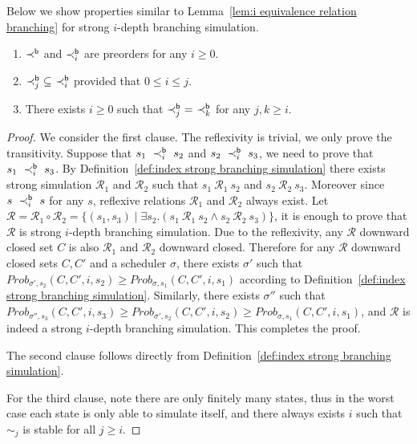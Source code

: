 \documentclass{LMCS}
\newcommand{\iBS}[1]{\sim_{#1}}
\newcommand{\iBSi}[1]{\prec_{#1}^{{\sf b}}}
\newcommand{\MC}[1]{\mathcal{#1}}
\newcommand{\MEASURE}{\mathit{Prob}}
\begin{document}
Below we show properties similar to Lemma~\ref{lem:i equivalence relation branching} for strong $i$-depth branching simulation.
\begin{lem}\label{lem:i preorder relation branching}\hfill
\begin{enumerate}[\em(1)]
\item $\iBSi{}$ and $\iBSi{i}$ are preorders for any $i\geq0$.
\item $\iBSi{j}~\subseteq~\iBSi{i}$ provided that $0\leq i \leq j$.
\item There exists $i\geq 0$ such that $\iBSi{j}~=~\iBSi{k}$ for any $j,k\geq i$.
\end{enumerate}
\end{lem}
\begin{proof}
We consider the first clause. The reflexivity is trivial, we only prove the
  transitivity. Suppose that $s_1~\iBSi{i}~s_2$ and
  $s_2~\iBSi{i}~s_3$, we need to prove that $s_1~\iBSi{i}~s_3$. By
  Definition~\ref{def:index strong branching simulation} there exists
  strong simulation $\MC{R}_1$ and $\MC{R}_2$ such that
  $s_1~\MC{R}_1~s_2$ and $s_2~\MC{R}_2~s_3$. 
 Moreover since $s~\iBSi{i}~s$ for any $s$,  reflexive relations $\MC{R}_1$ and $\MC{R}_2$  
  always exist. Let
  $\MC{R}=\MC{R}_1\circ\MC{R}_2=\{(s_1,s_3)\mid\exists
  s_2.(s_1~\MC{R}_1~s_2\land s_2~\MC{R}_2~s_3)\}$, it is enough to
  prove that $\MC{R}$ is strong $i$-depth branching simulation. Due to
  the reflexivity, any $\MC{R}$ downward closed set $C$ is also
  $\MC{R}_1$ and $\MC{R}_2$ downward closed. Therefore for any
  $\MC{R}$ downward closed sets $C,C'$ and a scheduler $\sigma$, 
  there exists $\sigma'$ such that
  $\MEASURE_{\sigma',s_2}(C,C',i,s_2)\geq\MEASURE_{\sigma,s_1}(C,C',i,s_1)$
  according to Definition~\ref{def:index strong branching
    simulation}. Similarly, there exists $\sigma''$ such that
  $\MEASURE_{\sigma'',s_3}(C,C',i,s_3)\geq\MEASURE_{\sigma',s_2}(C,C',i,s_2)\geq\MEASURE_{\sigma,s_1}(C,C',i,s_1)$,
  and $\MC{R}$ is indeed a strong $i$-depth branching simulation. This
  completes the proof.

The second clause follows directly  from Definition~\ref{def:index strong branching simulation}.

For the third clause, note there are only finitely many states, thus in the worst case each state
is only able to simulate itself, and there always exists $i$ such that $\iBS{j}$ is stable for all 
$j \ge i$.
\end{proof}
\end{document}
